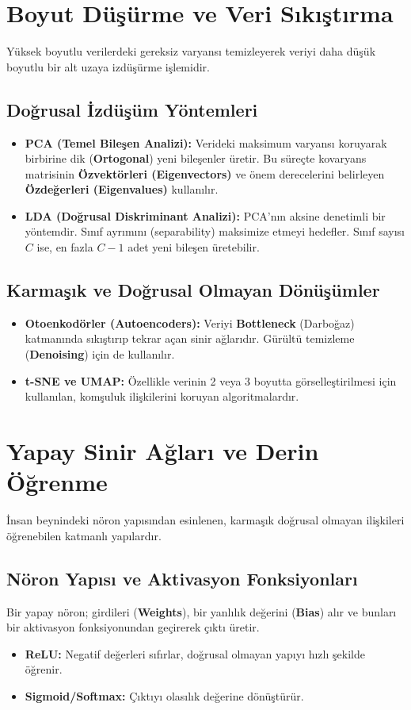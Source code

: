 \documentclass[12pt,a4paper]{article}
\begin{document}
\newpage
\section{Boyut Düşürme ve Veri Sıkıştırma}
Yüksek boyutlu verilerdeki gereksiz varyansı temizleyerek veriyi daha düşük boyutlu bir alt uzaya izdüşürme işlemidir.

\subsection{Doğrusal İzdüşüm Yöntemleri}
\begin{itemize}
    \item \textbf{PCA (Temel Bileşen Analizi):} Verideki maksimum varyansı koruyarak birbirine dik (\textbf{Ortogonal}) yeni bileşenler üretir. Bu süreçte kovaryans matrisinin \textbf{Özvektörleri (Eigenvectors)} ve önem derecelerini belirleyen \textbf{Özdeğerleri (Eigenvalues)} kullanılır.
    \item \textbf{LDA (Doğrusal Diskriminant Analizi):} PCA'nın aksine denetimli bir yöntemdir. Sınıf ayrımını (separability) maksimize etmeyi hedefler. Sınıf sayısı $C$ ise, en fazla $C-1$ adet yeni bileşen üretebilir.
\end{itemize}

\subsection{Karmaşık ve Doğrusal Olmayan Dönüşümler}
\begin{itemize}
    \item \textbf{Otoenkodörler (Autoencoders):} Veriyi \textbf{Bottleneck} (Darboğaz) katmanında sıkıştırıp tekrar açan sinir ağlarıdır. Gürültü temizleme (\textbf{Denoising}) için de kullanılır.
    \item \textbf{t-SNE ve UMAP:} Özellikle verinin 2 veya 3 boyutta görselleştirilmesi için kullanılan, komşuluk ilişkilerini koruyan algoritmalardır.
\end{itemize}


\newpage
\section{Yapay Sinir Ağları ve Derin Öğrenme}
İnsan beynindeki nöron yapısından esinlenen, karmaşık doğrusal olmayan ilişkileri öğrenebilen katmanlı yapılardır.

\subsection{Nöron Yapısı ve Aktivasyon Fonksiyonları}
Bir yapay nöron; girdileri (\textbf{Weights}), bir yanlılık değerini (\textbf{Bias}) alır ve bunları bir aktivasyon fonksiyonundan geçirerek çıktı üretir.
\begin{itemize}
    \item \textbf{ReLU:} Negatif değerleri sıfırlar, doğrusal olmayan yapıyı hızlı şekilde öğrenir.
    \item \textbf{Sigmoid/Softmax:} Çıktıyı olasılık değerine dönüştürür.
\end{itemize}
\end{document}

